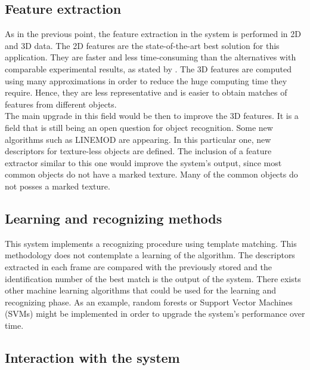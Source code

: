 	\subsection{Feature extraction}

	As in the previous point, the feature extraction in the system is performed in 2D and 3D data. 
	The 2D features are the state-of-the-art best solution for this application. 
	They are faster and less time-consuming than the alternatives with comparable experimental results, as stated by \cite{Miksik2012}. 
	The 3D features are computed using many approximations in order to reduce the huge computing time they require. 
	Hence, they are less representative and is easier to obtain matches of features from different objects. 
	\\

	The main upgrade in this field would be then to improve the 3D features. 
	It is a field that is still being an open question for object recognition.
	Some new algorithms such as LINEMOD \cite{Hinterstoisser2012} are appearing. 
	In this particular one, new descriptors for texture-less objects are defined. 
	The inclusion of a feature extractor similar to this one would improve the system's output, since most common objects do not have a marked texture.
	Many of the common objects do not posses a marked texture. 
	\\ 

	\subsection{Learning and recognizing methods}

	This system implements a recognizing procedure using template matching. 
	This methodology does not contemplate a learning of the algorithm. 
	The descriptors extracted in each frame are compared with the previously stored and the identification number of the best match is the output of the system.  
	There exists other machine learning algorithms that could be used for the learning and recognizing phase. 
	As an example, random forests \cite{Gall2012} or Support Vector Machines (SVMs) \cite{Pontil1998} might be implemented in order to upgrade the system's performance over time. 

	\subsection{Interaction with the system}

